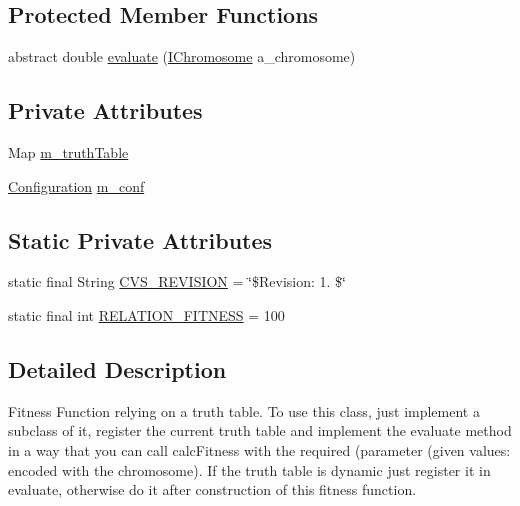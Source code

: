 \subsection*{Protected Member Functions}
\begin{DoxyCompactItemize}
\item 
abstract double \hyperlink{classorg_1_1jgap_1_1impl_1_1fitness_1_1_truth_table_fitness_function_a3f159f68ac2f247c18d1e62ff030c56c}{evaluate} (\hyperlink{interfaceorg_1_1jgap_1_1_i_chromosome}{I\-Chromosome} a\-\_\-chromosome)
\end{DoxyCompactItemize}
\subsection*{Private Attributes}
\begin{DoxyCompactItemize}
\item 
Map \hyperlink{classorg_1_1jgap_1_1impl_1_1fitness_1_1_truth_table_fitness_function_a73ca12c6dd875b317bc3c316a48b447d}{m\-\_\-truth\-Table}
\item 
\hyperlink{classorg_1_1jgap_1_1_configuration}{Configuration} \hyperlink{classorg_1_1jgap_1_1impl_1_1fitness_1_1_truth_table_fitness_function_a9b2a529b966eee30948c09fa02a9faef}{m\-\_\-conf}
\end{DoxyCompactItemize}
\subsection*{Static Private Attributes}
\begin{DoxyCompactItemize}
\item 
static final String \hyperlink{classorg_1_1jgap_1_1impl_1_1fitness_1_1_truth_table_fitness_function_ab173d16572fa3cb076091b2a524d1e61}{C\-V\-S\-\_\-\-R\-E\-V\-I\-S\-I\-O\-N} = \char`\"{}\$Revision\-: 1. \$\char`\"{}
\item 
static final int \hyperlink{classorg_1_1jgap_1_1impl_1_1fitness_1_1_truth_table_fitness_function_a596b1525fe57652af58e9589edc7ac3f}{R\-E\-L\-A\-T\-I\-O\-N\-\_\-\-F\-I\-T\-N\-E\-S\-S} = 100
\end{DoxyCompactItemize}


\subsection{Detailed Description}
Fitness Function relying on a truth table. To use this class, just implement a subclass of it, register the current truth table and implement the evaluate method in a way that you can call calc\-Fitness with the required (parameter (given values\-: encoded with the chromosome). If the truth table is dynamic just register it in evaluate, otherwise do it after construction of this fitness function.

